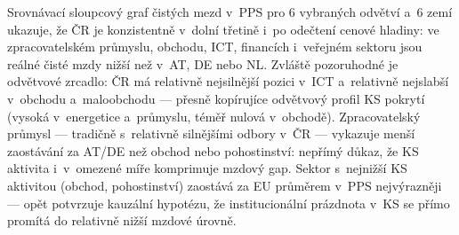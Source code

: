 Srovnávací sloupcový graf čistých mezd v~\ac{PPS} pro 6 vybraných odvětví a~6 zemí ukazuje, že ČR je konzistentně v~dolní třetině i~po odečtení cenové hladiny: ve zpracovatelském průmyslu, obchodu, ICT, financích i~veřejném sektoru jsou reálné čisté mzdy nižší než v~AT, DE nebo NL.
Zvláště pozoruhodné je odvětvové zrcadlo: ČR má relativně nejsilnější pozici v~ICT a~relativně nejslabší v~obchodu a~maloobchodu --- přesně kopírujíce odvětvový profil \ac{KS} pokrytí (vysoká v~energetice a~průmyslu, téměř nulová v~obchodě).
Zpracovatelský průmysl --- tradičně s~relativně silnějšími odbory v~ČR --- vykazuje menší zaostávání za AT/DE než obchod nebo pohostinství: nepřímý důkaz, že \ac{KS} aktivita i~v~omezené míře komprimuje mzdový gap.
Sektor s~nejnižší \ac{KS} aktivitou (obchod, pohostinství) zaostává za \ac{EU} průměrem v~\ac{PPS} nejvýrazněji --- opět potvrzuje kauzální hypotézu, že institucionální prázdnota v~\ac{KS} se přímo promítá do relativně nižší mzdové úrovně.


